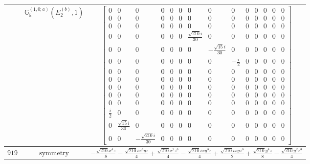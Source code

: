 \documentclass[fleqn,8pt,landscape]{jsarticle}
\begin{document}
\begin{longtable}{ccc}
$  $ & $ \mathbb{G}_{5}^{(1,0;a)}(E_{2}^{(b)},1) $ & $ \begin{bmatrix} 0 & 0 & 0 & 0 & 0 & 0 & 0 & 0 & 0 & 0 & 0 & 0 & 0 & 0 \\ 0 & 0 & 0 & 0 & 0 & 0 & 0 & 0 & 0 & 0 & 0 & 0 & 0 & 0 \\ 0 & 0 & 0 & 0 & 0 & 0 & 0 & 0 & 0 & 0 & 0 & 0 & 0 & 0 \\ 0 & 0 & 0 & 0 & 0 & 0 & \frac{\sqrt{210} i}{30} & 0 & 0 & 0 & 0 & 0 & 0 & 0 \\ 0 & 0 & 0 & 0 & 0 & 0 & 0 & - \frac{\sqrt{15} i}{30} & 0 & 0 & 0 & 0 & 0 & 0 \\ 0 & 0 & 0 & 0 & 0 & 0 & 0 & 0 & - \frac{i}{2} & 0 & 0 & 0 & 0 & 0 \\ 0 & 0 & 0 & 0 & 0 & 0 & 0 & 0 & 0 & 0 & 0 & 0 & 0 & 0 \\ 0 & 0 & 0 & 0 & 0 & 0 & 0 & 0 & 0 & 0 & 0 & 0 & 0 & 0 \\ 0 & 0 & 0 & 0 & 0 & 0 & 0 & 0 & 0 & 0 & 0 & 0 & 0 & 0 \\ 0 & 0 & 0 & 0 & 0 & 0 & 0 & 0 & 0 & 0 & 0 & 0 & 0 & 0 \\ 0 & 0 & 0 & 0 & 0 & 0 & 0 & 0 & 0 & 0 & 0 & 0 & 0 & 0 \\ \frac{i}{2} & 0 & 0 & 0 & 0 & 0 & 0 & 0 & 0 & 0 & 0 & 0 & 0 & 0 \\ 0 & \frac{\sqrt{15} i}{30} & 0 & 0 & 0 & 0 & 0 & 0 & 0 & 0 & 0 & 0 & 0 & 0 \\ 0 & 0 & - \frac{\sqrt{210} i}{30} & 0 & 0 & 0 & 0 & 0 & 0 & 0 & 0 & 0 & 0 & 0 \end{bmatrix} $ \\ \hline
$ 919 $ & $ \text{symmetry} $ & $ - \frac{\sqrt{210} x^{4} z}{8} - \frac{\sqrt{210} i x^{3} y z}{4} + \frac{\sqrt{210} x^{2} z^{3}}{4} - \frac{\sqrt{210} i x y^{3} z}{4} + \frac{\sqrt{210} i x y z^{3}}{2} + \frac{\sqrt{210} y^{4} z}{8} - \frac{\sqrt{210} y^{2} z^{3}}{4} $ \\

\end{longtable}
\end{document}

